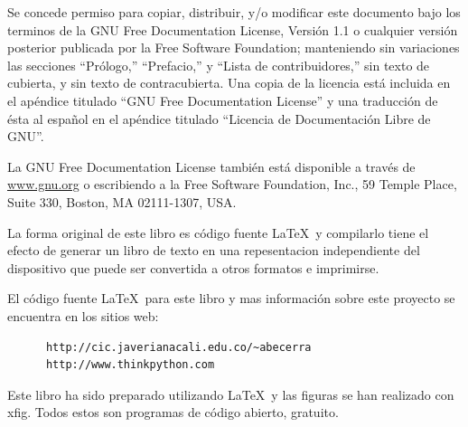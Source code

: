 \documentclass[letterpaper,twoside,10pt]{book}
\begin{document}
Se concede permiso para copiar, distribuir, y/o modificar este documento bajo
los terminos de la GNU Free Documentation License, Versión 1.1 o cualquier
versión posterior publicada por la Free Software Foundation; manteniendo 
sin variaciones las secciones ``Prólogo,'' ``Prefacio,'' y ``Lista de contribuidores,''
sin texto de cubierta, y sin texto de contracubierta. Una copia de la licencia
está incluida en el apéndice titulado ``GNU Free Documentation License'' y una 
traducción de ésta al español en el apéndice titulado ``Licencia de Documentación Libre de GNU''.

La GNU Free Documentation License también está disponible a través de \url{www.gnu.org}
o escribiendo a la Free Software Foundation, Inc., 59 Temple Place,
Suite 330, Boston, MA 02111-1307, USA.

La forma original de este libro es código fuente \LaTeX\  y compilarlo
tiene el efecto de generar un libro de texto en una 
repesentacion independiente del dispositivo que puede ser convertida a otros 
formatos e imprimirse.

El código  fuente \LaTeX\  para este libro y mas información sobre este proyecto
se encuentra en los sitios web:

\begin{verbatim}
      http://cic.javerianacali.edu.co/~abecerra
      http://www.thinkpython.com
\end{verbatim}

Este libro ha sido preparado utilizando \LaTeX\ y las figuras
se han realizado con xfig.  Todos estos son programas de código
abierto, gratuito.

\vspace{0.25in}
\newpage
\thispagestyle{empty}
\end{document}
